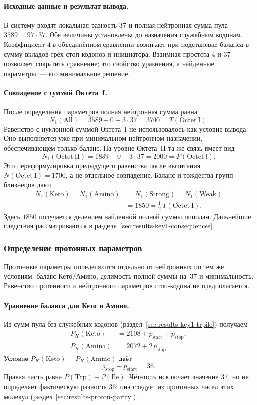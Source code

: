 \documentclass[11pt,a4paper]{article}
\renewcommand{\_}{\origunderscore\allowbreak}
\begin{document}
\paragraph{Исходные данные и результат вывода.}
В систему входят локальная разность $37$ и полная нейтронная
сумма пула $3589=97\cdot37$. Обе величины установлены до
назначения служебным кодонам. Коэффициент $4$ в объединённом
сравнении возникает при подстановке баланса в сумму вкладов
трёх стоп-кодонов и инициатора. Взаимная простота $4$ и $37$
позволяет сократить сравнение; это свойство уравнения, а
найденные параметры~--- его минимальное решение.

\paragraph{Совпадение с суммой Октета~I.}
После определения параметров полная нейтронная сумма равна
\[
N_1(\mathrm{All})=3589+0+3\cdot37
=3700=T(\mathrm{Octet~I}).
\]
Равенство с нуклонной суммой Октета~I не использовалось
как условие вывода. Оно выполняется уже при минимальном
нейтронном назначении, обеспечивающем только баланс.
На уровне Октета~II та же связь имеет вид
\[
N_1(\mathrm{Octet~II})=1889+0+3\cdot37
=2000=P(\mathrm{Octet~I}).
\]
Это переформулировка предыдущего равенства после вычитания
$N(\mathrm{Octet~I})=1700$, а не отдельное совпадение.
Баланс и тождества групп-близнецов дают
\[
\begin{aligned}
N_1(\mathrm{Keto})=N_1(\mathrm{Amino})
&=N_1(\mathrm{Strong})=N_1(\mathrm{Weak})\\
&=1850=\tfrac12\,T(\mathrm{Octet~I}).
\end{aligned}
\]
Здесь $1850$ получается делением найденной полной суммы пополам.
Дальнейшие следствия рассматриваются в
разделе~\ref{sec:results-key1-consequences}.

\subsubsection{Определение протонных параметров}
\label{sec:results-key1-protons}

Протонные параметры определяются отдельно от нейтронных
по тем же условиям: баланс Кето/Амино, делимость полной
суммы на~$37$ и минимальность. Равенство протонного
и нейтронного параметров стоп-кодона не предполагается.

\paragraph{Уравнение баланса для Кето и Амино.}
Из сумм пула без служебных кодонов
(раздел~\ref{sec:results-key1-trpile}) получаем
\begin{align*}
P_K(\mathrm{Keto}) &= 2108+p_{\text{start}}+p_{\text{stop}},\\
P_K(\mathrm{Amino}) &= 2072+2\,p_{\text{stop}}.
\end{align*}
Условие $P_K(\mathrm{Keto})=P_K(\mathrm{Amino})$ даёт
\[
p_{\text{stop}}-p_{\text{start}}=36.
\]
Правая часть равна $P(\mathrm{Trp})-P(\mathrm{Ile})$.
Чётность исключает значение $37$, но не определяет
фактическую разность $36$: она следует из протонных чисел
этих молекул (раздел~\ref{sec:results-proton-parity}).
\end{document}
